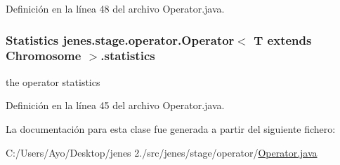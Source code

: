 Definición en la línea 48 del archivo Operator.\-java.

\hypertarget{classjenes_1_1stage_1_1operator_1_1_operator_3_01_t_01extends_01_chromosome_01_4_a45afa214a1e9109845c8f67165942675}{
\subsubsection[{statistics}]{\setlength{\rightskip}{0pt plus 5cm}Statistics jenes.\-stage.\-operator.\-Operator$<$ T extends Chromosome $>$.statistics\hspace{0.3cm}{\ttfamily [protected]}}}\label{classjenes_1_1stage_1_1operator_1_1_operator_3_01_t_01extends_01_chromosome_01_4_a45afa214a1e9109845c8f67165942675}
the operator statistics 

Definición en la línea 45 del archivo Operator.\-java.



La documentación para esta clase fue generada a partir del siguiente fichero\-:\begin{DoxyCompactItemize}
\item 
C\-:/\-Users/\-Ayo/\-Desktop/jenes 2./src/jenes/stage/operator/\hyperlink{_operator_8java}{Operator.\-java}\end{DoxyCompactItemize}
